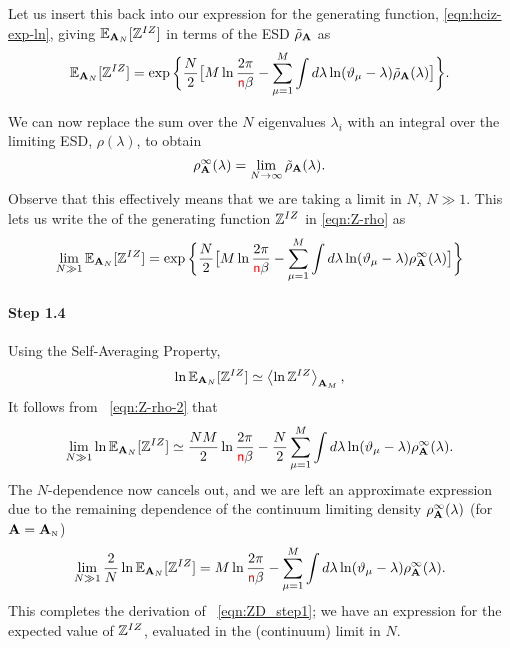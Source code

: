 Let us insert this back into our
expression for the generating function,
\ref{eqn:hciz-exp-ln},   %
giving
$\EZDATWO$ in terms of the ESD $\tilde{\rho}_{\AMAT}$ as
\begin{equation}
\label{eqn:Z-rho}
    \EZDATWO=\exp\bigg\{\dfrac{N}{2}\big[M\ln\dfrac{2\pi}{\ND\beta}-\sum_{\mu=1}^{M}\int
        d\lambda\ln(\DeltaMu-\lambda)\tilde{\rho}_{\AMAT}(\lambda)\big]\bigg\}  .
\end{equation}

We can now replace
the sum over the $N$ eigenvalues $\lambda_{i}$ with an integral over the limiting
ESD, $\rho(\lambda)$, to obtain
\begin{equation}
\label{eqn:rho-}
\rho^{\infty}_{\AMAT}(\lambda)=    \lim_{N\rightarrow\infty}\tilde\rho_{\AMAT}(\lambda)  .
\end{equation}
Observe that this effectively means that we are taking a \LargeN limit in $N$, $N\gg 1$.
%
This lets us write the \ExpectedValue of the generating function $\ZD$
in \ref{eqn:Z-rho}
as
\begin{equation}
\label{eqn:Z-rho-2}
    \lim_{N\gg 1}\EZDATWO=\exp\bigg\{\dfrac{N}{2}\big[M\ln\dfrac{2\pi}{\ND\beta}-
    \sum_{\mu=1}^{M}\int
        d\lambda\ln(\DeltaMu-\lambda)\rho^{\infty}_{\AMAT}(\lambda)\big]\bigg\}
\end{equation}

\paragraph{Step 1.4}

Using the Self-Averaging Property,
\begin{equation}
   \ln \EZDATWO \simeq \Expected[\mathbf{A}_M]{\ln \ZD} ,
\end{equation}
It follows from \EQN~\ref{eqn:Z-rho-2}
that
\begin{equation}
   \lim_{N\gg 1} \ln \EZDATWO
   \simeq \dfrac{N M}{2}\ln\dfrac{2\pi}{\ND\beta}
         -\dfrac{N}{2}\sum_{\mu=1}^{M}\int d\lambda\ln(\DeltaMu-\lambda)\rho^{\infty}_{\AMAT}(\lambda)  .
\end{equation}
%
The $N$-dependence now cancels out,
and we are left an approximate expression due to the remaining dependence of the continuum limiting density
$\rho^{\infty}_{\AMAT}(\lambda)$ (for $\AMAT=\AMATN$)
%
\begin{equation}
\label{eqn:ln-Z-Nlim2}
    \lim_{N \gg 1}\dfrac{2}{N}\ln \EZDATWO
    = M\ln\dfrac{2\pi}{\ND\beta}-\sum_{\mu=1}^{M}\int d\lambda\ln(\DeltaMu-\lambda)\rho^{\infty}_{\AMAT}(\lambda)  .
\end{equation}
This completes the derivation of \EQN~\ref{eqn:ZD_step1}; 
we have an expression for the expected value of $\ZD$,
evaluated in the \LargeN (continuum) limit in $N$.

